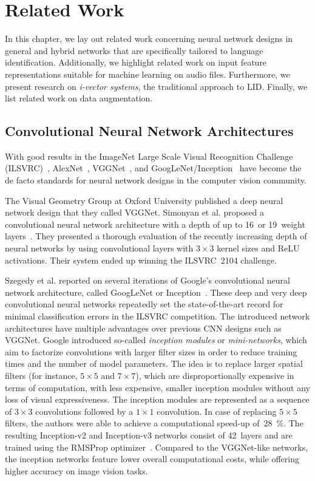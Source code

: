 \section{Related Work}
\label{sec:related_work}
In this chapter, we lay out related work concerning neural network designs in general and hybrid networks that are specifically tailored to language identification. Additionally, we highlight related work on input feature representations suitable for machine learning on audio files. Furthermore, we present research on \emph{i-vector systems}, the traditional approach to LID. Finally, we list related work on data augmentation.

\subsection{Convolutional Neural Network Architectures}
With good results in the ImageNet Large Scale Visual Recognition Challenge (ILSVRC)~\cite{ILSVRC15}, AlexNet~\cite{krizhevsky2012imagenet}, VGGNet~\cite{simonyan2014very}, and GoogLeNet/Inception~\cite{szegedy2015going} have become the de facto standards for neural network designs in the computer vision community.

The Visual Geometry Group at Oxford University published a deep neural network design that they called VGGNet. Simonyan et al. proposed a convolutional neural network architecture with a depth of up to \num{16}~or \num{19}~weight layers~\cite{simonyan2014very, Chatfield14}. They presented a thorough evaluation of the recently increasing depth of neural networks by using convolutional layers with $3 \times 3$ kernel sizes and ReLU activations. Their system ended up winning the ILSVRC~2104 challenge.

Szegedy et al. reported on several iterations of Google's convolutional neural network architecture, called GoogLeNet or Inception~\cite{szegedy2015going, szegedy2016rethinking, szegedy2016inception}. These deep and very deep convolutional neural networks repeatedly set the state-of-the-art record for minimal classification errors in the ILSVRC competition. The introduced network architectures have multiple advantages over previous CNN designs such as VGGNet. Google introduced so-called \emph{inception modules} or \emph{mini-networks}, which aim to factorize convolutions with larger filter sizes in order to reduce training times and the number of model parameters. The idea is to replace larger spatial filters (for instance, $5 \times 5$ and $7 \times 7$), which are disproportionally expensive in terms of computation, with less expensive, smaller inception modules without any loss of visual expressiveness. The inception modules are represented as a sequence of $3 \times 3$ convolutions followed by a $1 \times 1$ convolution. In case of replacing $5 \times 5$ filters, the authors were able to achieve a computational speed-up of~\SI{28}{\percent}. The resulting Inception-v2 and Inception-v3 networks consist of \num{42}~layers and are trained using the RMSProp optimizer~\cite{tieleman2012lecture}. Compared to the VGGNet-like networks, the inception networks feature lower overall computational costs, while offering higher accuracy on image vision tasks.

